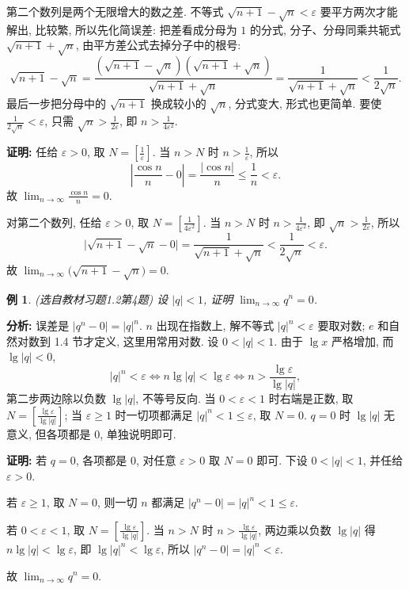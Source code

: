 \documentclass[UTF8,openany]{ctexbook}
\theoremstyle{chinesetextbook}
\newtheorem{example}{例}[section]
\newenvironment{cnproof}{\par\indent\textbf{证明:} \ignorespaces}{\par}
\begin{document}
第二个数列是两个无限增大的数之差. 不等式 $\sqrt{n+1}-\sqrt n<\varepsilon$ 要平方两次才能解出, 比较繁, 所以先化简误差: 把差看成分母为 $1$ 的分式, 分子、分母同乘共轭式 $\sqrt{n+1}+\sqrt n$, 由平方差公式去掉分子中的根号:
\[
\sqrt{n+1}-\sqrt n=\frac{(\sqrt{n+1}-\sqrt n)(\sqrt{n+1}+\sqrt n)}{\sqrt{n+1}+\sqrt n}=\frac1{\sqrt{n+1}+\sqrt n}<\frac1{2\sqrt n}.
\]
最后一步把分母中的 $\sqrt{n+1}$ 换成较小的 $\sqrt n$, 分式变大, 形式也更简单. 要使 $\displaystyle\frac1{2\sqrt n}<\varepsilon$, 只需 $\displaystyle\sqrt n>\frac1{2\varepsilon}$, 即 $\displaystyle n>\frac1{4\varepsilon^2}$.
\begin{cnproof}
任给 $\varepsilon>0$, 取 $\displaystyle N=\left[\frac1\varepsilon\right]$. 当 $n>N$ 时 $\displaystyle n>\frac1\varepsilon$, 所以
\[
\left|\frac{\cos n}n-0\right|=\frac{|\cos n|}n\le\frac1n<\varepsilon.
\]
故 $\displaystyle\lim_{n\to\infty}\frac{\cos n}n=0$.

对第二个数列, 任给 $\varepsilon>0$, 取 $\displaystyle N=\left[\frac1{4\varepsilon^2}\right]$. 当 $n>N$ 时 $\displaystyle n>\frac1{4\varepsilon^2}$, 即 $\displaystyle\sqrt n>\frac1{2\varepsilon}$, 所以
\[
\bigl|\sqrt{n+1}-\sqrt n-0\bigr|=\frac1{\sqrt{n+1}+\sqrt n}<\frac1{2\sqrt n}<\varepsilon.
\]
故 $\displaystyle\lim_{n\to\infty}\bigl(\sqrt{n+1}-\sqrt n\bigr)=0$.
\end{cnproof}
\begin{example}\label{ex:h12-4}
\textnormal{(选自教材习题1.2第4题)} 设 $|q|<1$, 证明 $\displaystyle\lim_{n\to\infty}q^n=0$.
\end{example}
\par\indent\textbf{分析:} 误差是 $|q^n-0|=|q|^n$. $n$ 出现在指数上, 解不等式 $|q|^n<\varepsilon$ 要取对数; $e$ 和自然对数到 1.4 节才定义, 这里用常用对数. 设 $0<|q|<1$. 由于 $\lg x$ 严格增加, 而 $\lg|q|<0$,
\[
|q|^n<\varepsilon\iff n\lg|q|<\lg\varepsilon\iff n>\frac{\lg\varepsilon}{\lg|q|},
\]
第二步两边除以负数 $\lg|q|$, 不等号反向. 当 $0<\varepsilon<1$ 时右端是正数, 取 $\displaystyle N=\left[\frac{\lg\varepsilon}{\lg|q|}\right]$; 当 $\varepsilon\ge1$ 时一切项都满足 $|q|^n<1\le\varepsilon$, 取 $N=0$. $q=0$ 时 $\lg|q|$ 无意义, 但各项都是 $0$, 单独说明即可.
\begin{cnproof}
若 $q=0$, 各项都是 $0$, 对任意 $\varepsilon>0$ 取 $N=0$ 即可. 下设 $0<|q|<1$, 并任给 $\varepsilon>0$.

若 $\varepsilon\ge1$, 取 $N=0$, 则一切 $n$ 都满足 $|q^n-0|=|q|^n<1\le\varepsilon$.

若 $0<\varepsilon<1$, 取 $\displaystyle N=\left[\frac{\lg\varepsilon}{\lg|q|}\right]$. 当 $n>N$ 时 $\displaystyle n>\frac{\lg\varepsilon}{\lg|q|}$, 两边乘以负数 $\lg|q|$ 得 $n\lg|q|<\lg\varepsilon$, 即 $\lg|q|^n<\lg\varepsilon$, 所以 $|q^n-0|=|q|^n<\varepsilon$.

故 $\displaystyle\lim_{n\to\infty}q^n=0$.
\end{cnproof}
\end{document}
